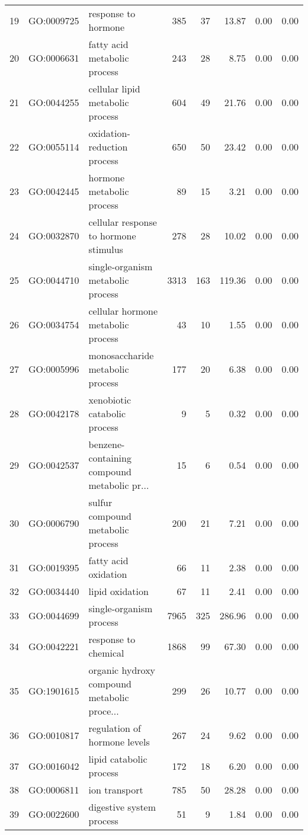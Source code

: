 \begin{table}[ht]
\begin{tabular}{rllrrrrr}
  19 & GO:0009725 & response to hormone & 385 &  37 & 13.87 & 0.00 & 0.00 \\ 
  20 & GO:0006631 & fatty acid metabolic process & 243 &  28 & 8.75 & 0.00 & 0.00 \\ 
  21 & GO:0044255 & cellular lipid metabolic process & 604 &  49 & 21.76 & 0.00 & 0.00 \\ 
  22 & GO:0055114 & oxidation-reduction process & 650 &  50 & 23.42 & 0.00 & 0.00 \\ 
  23 & GO:0042445 & hormone metabolic process &  89 &  15 & 3.21 & 0.00 & 0.00 \\ 
  24 & GO:0032870 & cellular response to hormone stimulus & 278 &  28 & 10.02 & 0.00 & 0.00 \\ 
  25 & GO:0044710 & single-organism metabolic process & 3313 & 163 & 119.36 & 0.00 & 0.00 \\ 
  26 & GO:0034754 & cellular hormone metabolic process &  43 &  10 & 1.55 & 0.00 & 0.00 \\ 
  27 & GO:0005996 & monosaccharide metabolic process & 177 &  20 & 6.38 & 0.00 & 0.00 \\ 
  28 & GO:0042178 & xenobiotic catabolic process &   9 &   5 & 0.32 & 0.00 & 0.00 \\ 
  29 & GO:0042537 & benzene-containing compound metabolic pr... &  15 &   6 & 0.54 & 0.00 & 0.00 \\ 
  30 & GO:0006790 & sulfur compound metabolic process & 200 &  21 & 7.21 & 0.00 & 0.00 \\ 
  31 & GO:0019395 & fatty acid oxidation &  66 &  11 & 2.38 & 0.00 & 0.00 \\ 
  32 & GO:0034440 & lipid oxidation &  67 &  11 & 2.41 & 0.00 & 0.00 \\ 
  33 & GO:0044699 & single-organism process & 7965 & 325 & 286.96 & 0.00 & 0.00 \\ 
  34 & GO:0042221 & response to chemical & 1868 &  99 & 67.30 & 0.00 & 0.00 \\ 
  35 & GO:1901615 & organic hydroxy compound metabolic proce... & 299 &  26 & 10.77 & 0.00 & 0.00 \\ 
  36 & GO:0010817 & regulation of hormone levels & 267 &  24 & 9.62 & 0.00 & 0.00 \\ 
  37 & GO:0016042 & lipid catabolic process & 172 &  18 & 6.20 & 0.00 & 0.00 \\ 
  38 & GO:0006811 & ion transport & 785 &  50 & 28.28 & 0.00 & 0.00 \\ 
  39 & GO:0022600 & digestive system process &  51 &   9 & 1.84 & 0.00 & 0.00 \\ 

\end{tabular}
\end{table}

